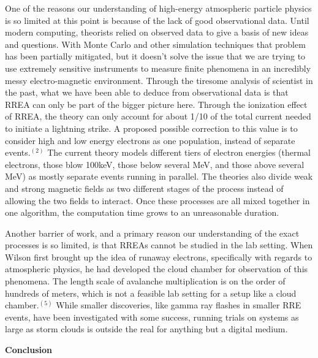 \documentclass[11pt]{article}
\begin{document}
\begin{multicols*}{2}
    One of the reasons our understanding of high-energy atmospheric particle physics is so limited at this point is because of the lack of good observational data. Until modern computing, theorists relied on observed data to give a basis of new ideas and questions. With Monte Carlo and other simulation techniques that problem has been partially mitigated, but it doesn't solve the issue that we are trying to use extremely sensitive instruments to measure finite phenomena in an incredibly messy electro-magnetic environment. Through the tiresome analysis of scientist in the past, what we have been able to deduce from observational data is that RREA can only be part of the bigger picture here. Through the ionization effect of RREA, the theory can only account for about 1/10 of the total current needed to initiate a lightning strike. A proposed possible correction to this value is to consider high and low energy electrons as one population, instead of separate events.$^{(2)}$ The current theory models different tiers of electron energies (thermal electrons, those blow 100keV, those below several MeV, and those above several MeV) as mostly separate events running in parallel. The theories also divide weak and strong magnetic fields as two different stages of the process instead of allowing the two fields to interact. Once these processes are all mixed together in one algorithm, the computation time grows to an unreasonable duration. 
    
    Another barrier of work, and a primary reason our understanding of the exact processes is so limited, is that RREAs cannot be studied in the lab setting. When Wilson first brought up the idea of runaway electrons, specifically with regards to atmospheric physics, he had developed the cloud chamber for observation of this phenomena. The length scale of avalanche multiplication is on the order of hundreds of meters, which is not a feasible lab setting for a setup like a cloud chamber.$^{(5)}$ While smaller discoveries, like gamma ray flashes in smaller RRE events, have been investigated with some success, running trials on systems as large as storm clouds is outside the real for anything but a digital medium. 
    \newline
    

    \noindent
{\bf \LARGE Conclusion}
    

\end{multicols*}
\end{document}
